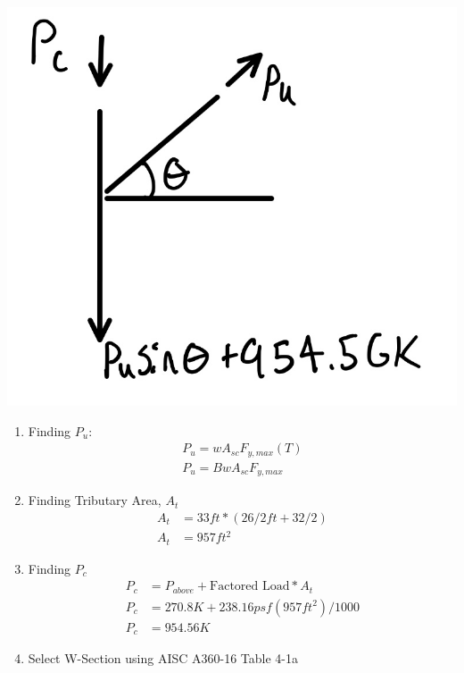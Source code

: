 \documentclass{report} %
\begin{document}
\begin{center}
    \includegraphics[scale=0.15]{RoofLateralSYstem_B3_C3_Loads}
\end{center}
\begin{enumerate}
    \item Finding $P_u$:
        \begin{equation*}
            \begin{aligned}
                P_u = wA_{sc}F_{y,max} (T) \\
                P_u = BwA_{sc}F_{y,max} 
            \end{aligned}
        \end{equation*}
    \item Finding Tributary Area, $A_t$
        \begin{equation*}
            \begin{aligned}
                A_t &= 33ft*(26/2ft+32/2) \\
                A_t &= 957ft^2
            \end{aligned}
        \end{equation*}
    \item Finding $P_c$
        \begin{equation*}
            \begin{aligned}
                P_c &= P_{above} + \text{Factored Load} * A_t \\ 
                P_c &= 270.8K + 238.16psf(957ft^2)/1000 \\
                P_c &= 954.56K
            \end{aligned}
        \end{equation*}
    \item Select W-Section using AISC A360-16 Table 4-1a
        \begin{center}
        \end{center}
\end{enumerate}
\end{document}
